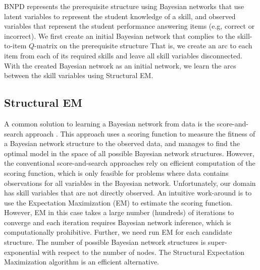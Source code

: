 \documentclass{edm_template}
\begin{document}
BNPD represents the prerequisite structure using Bayesian networks that use latent variables to represent the student knowledge of a skill, 
and observed variables that represent the student performance answering items (e.g, correct or incorrect).
We first create an initial Bayesian network that complies to the skill-to-item $Q$-matrix
on the prerequisite structure 
That is, we create an arc to each item from each of its required skills and leave all skill variables disconnected.
With the created Bayesian network as an initial network, we learn the arcs between the skill variables using Structural EM.

\subsection{Structural EM}

A common solution to learning a Bayesian network from data is the score-and-search approach \cite{cooper1992bayesian,heckerman1997bayesian}.
This approach uses a scoring function to measure the fitness of a Bayesian network structure to the observed data, 
and manages to find the optimal model in the space of all possible Bayesian network structures.
However, the conventional score-and-search approaches rely on efficient computation of the scoring function, 
which is only feasible for problems where data contains observations for all variables in the Bayesian network.
Unfortunately, our domain has skill variables that are not directly observed.
An intuitive work-around is to use the Expectation Maximization (EM) to estimate the scoring function.
However, EM in this case takes a large number (hundreds) of iterations to converge and each iteration requires Bayesian network inference, 
which is computationally prohibitive.
Further, we need run EM for each candidate structure. The number of possible Bayesian network structures is super-exponential with respect to the number of nodes.
The Structural Expectation Maximization algorithm \cite{friedman1997learning,friedman1998bayesian} is an efficient alternative.
\end{document}
